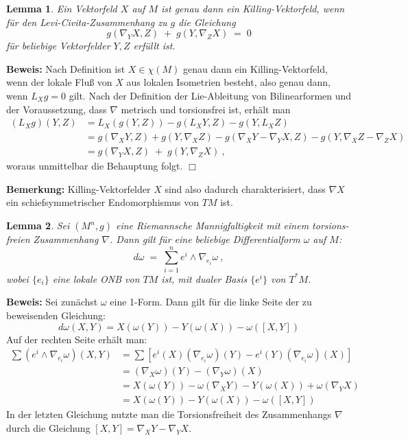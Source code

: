 \documentclass[12pt,a4paper]{article}
\newtheorem{Lemma}{Lemma}[section]
\def\proof{\noindent\textbf{Beweis:}\quad}
\def\qed{\quad\hfill\ensuremath{\Box}}
\begin{document}
\begin{Lemma}
Ein Vektorfeld $X$ auf $M$ ist genau dann ein Killing-Vektorfeld, wenn
f\"ur den Levi-Civita-Zusammenhang zu $g$ die Gleichung
$$
g(\nabla_YX, Z) \;+\; g(Y, \nabla_ZX) \;=\; 0
$$
f\"ur beliebige Vektorfelder $Y, Z$ erf\"ullt ist.
\end{Lemma}
\proof
Nach Definition ist $X \in \chi(M)$ genau dann ein Killing-Vektorfeld, wenn
der lokale Flu\ss{} von $X$ aus lokalen Isometrien besteht, also genau dann,
wenn $L_Xg=0$ gilt. Nach der Definition der Lie-Ableitung von Bilinearformen
und der Voraussetzung, dass $\nabla$ metrisch und torsionsfrei ist, erh\"alt man
$$
\begin{array}{rl}
(L_X g)(Y,Z) & = L_X(g(Y,Z)) - g(L_XY, Z) - g(Y, L_XZ)\\[1.5ex]
& =
g(\nabla_XY, Z) + g(Y, \nabla_XZ) - g(\nabla_XY - \nabla_YX, Z) - g(Y, \nabla_XZ - \nabla_ZX)\\[1.5ex]
& =
g(\nabla_YX, Z) \;+\; g(Y, \nabla_ZX) \ ,
\end{array}
$$
woraus unmittelbar die Behauptung folgt.
\qed

\bigskip

{\bf Bemerkung:}
Killing-Vektorfelder $X$ sind also dadurch charakterisiert, dass $\nabla X$ ein schiefsymmetrischer
Endomorphismus von $TM$ ist.

\bigskip

\begin{Lemma}
Sei $(M^n, g)$ eine Riemannsche Mannigfaltigkeit mit einem torsions-freien Zusammenhang
$\nabla$. Dann gilt f\"ur eine beliebige Differentialform $\omega$ auf $M$:
$$
d\omega \;=\; \sum^n_{i=1} e^i \wedge \nabla_{e_i} \omega
\ ,
$$
wobei $\{e_i\}$ eine lokale ONB von $TM$ ist, mit dualer Basis $\{e^i\}$  von $T^*M$.
\end{Lemma}
\proof
Sei zun\"achst $\omega$ eine 1-Form. Dann gilt f\"ur die linke Seite der zu beweisenden
Gleichung:
$$
d\omega (X,Y) = X(\omega(Y)) - Y(\omega(X)) - \omega([X,Y])
$$
Auf der rechten Seite erh\"alt man:
$$
\begin{array}{rl}
 \sum (e^i \wedge \nabla_{e_i} \omega)(X, Y)
& =
\sum [e^i(X)(\nabla_{e_i} \omega)(Y) - e^i(Y)(\nabla_{e_i} \omega)(X)] \\[1.5ex]
& =
(\nabla_X \omega)(Y) - (\nabla_Y \omega)(X) \\[1.5ex]
& =
X(\omega(Y)) - \omega(\nabla_XY) - Y(\omega(X)) + \omega(\nabla_YX) \\[1.5ex]
& =
 X(\omega(Y)) - Y(\omega(X)) - \omega([X,Y])
\end{array}
$$
In der letzten Gleichung nutzte man die Torsionsfreiheit des Zusammenhangs $\nabla$ durch
die Gleichung $[X, Y] = \nabla_XY - \nabla_YX$.
\end{document}
